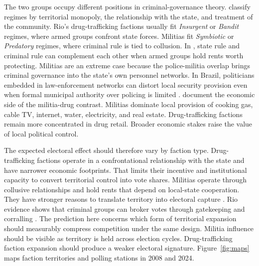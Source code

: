 \documentclass[11pt]{article}
\begin{document}
The two groups occupy different positions in criminal-governance theory. \citet{magaloni2020killing} classify regimes by territorial monopoly, the relationship with the state, and treatment of the community. Rio's drug-trafficking factions usually fit \emph{Insurgent} or \emph{Bandit} regimes, where armed groups confront state forces. Militias fit \emph{Symbiotic} or \emph{Predatory} regimes, where criminal rule is tied to collusion. In \citet{blattman2025gangrule}, state rule and criminal rule can complement each other when armed groups hold rents worth protecting. Militias are an extreme case because the police-militia overlap brings criminal governance into the state's own personnel networks. In Brazil, politicians embedded in law-enforcement networks can distort local security provision even when formal municipal authority over policing is limited \citep{novaes2023laworder}. \citet{monteiro2023enterprises} document the economic side of the militia-drug contrast. Militias dominate local provision of cooking gas, cable TV, internet, water, electricity, and real estate. Drug-trafficking factions remain more concentrated in drug retail. Broader economic stakes raise the value of local political control.

The expected electoral effect should therefore vary by faction type. Drug-trafficking factions operate in a confrontational relationship with the state and have narrower economic footprints. That limits their incentive and institutional capacity to convert territorial control into vote shares. Militias operate through collusive relationships and hold rents that depend on local-state cooperation. They have stronger reasons to translate territory into electoral capture \citep{trejo2020votes, snyder2009protection, pantaleao2025elections}. Rio evidence shows that criminal groups can broker votes through gatekeeping and corralling \citep{trudeau2025criminal}. The prediction here concerns which form of territorial expansion should measurably compress competition under the same design. Militia influence should be visible as territory is held across election cycles. Drug-trafficking faction expansion should produce a weaker electoral signature. Figure~\ref{fig:maps} maps faction territories and polling stations in 2008 and 2024.
\end{document}
